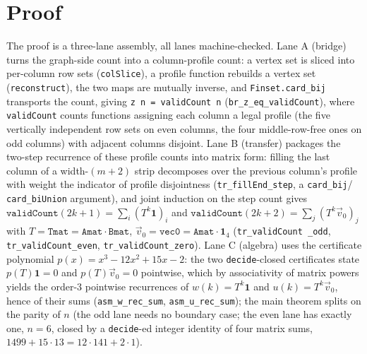 \documentclass[11pt]{article}
\begin{document}
\section{Proof}\label{sec:proof}

The proof is a three-lane assembly, all lanes machine-checked. Lane A
(bridge) turns the graph-side count into a column-profile count: a vertex
set is sliced into per-column row sets (\texttt{colSlice}), a profile
function rebuilds a vertex set (\texttt{reconstruct}), the two maps are
mutually inverse, and \texttt{Finset.card\_bij} transports the count, giving
\texttt{z n = validCount n} (\texttt{br\_z\_eq\_validCount}), where
\texttt{validCount} counts functions assigning each column a legal profile
(the five vertically independent row sets on even columns, the four
middle-row-free ones on odd columns) with adjacent columns disjoint. Lane B
(transfer) packages the two-step recurrence of these profile counts into
matrix form: filling the last column of a width-$(m{+}2)$ strip decomposes
over the previous column's profile with weight the indicator of profile
disjointness (\texttt{tr\_fillEnd\_step}, a \texttt{card\_bij}/%
\texttt{card\_biUnion} argument), and joint induction on the step count
gives $\texttt{validCount}(2k+1) = \sum_i (T^k \mathbf{1})_i$ and
$\texttt{validCount}(2k+2) = \sum_j (T^k \vec{v}_0)_j$ with
$T = \texttt{Tmat} = \texttt{Amat}\cdot\texttt{Bmat}$, $\vec{v}_0 =
\texttt{vec0} = \texttt{Amat}\cdot\mathbf{1}_4$ (\texttt{tr\_validCount%
\_odd}, \texttt{tr\_validCount\_even}, \texttt{tr\_validCount\_zero}). Lane
C (algebra) uses the certificate polynomial $p(x) = x^3 - 12x^2 + 15x - 2$:
the two \texttt{decide}-closed certificates state $p(T)\mathbf{1} = 0$ and
$p(T)\vec{v}_0 = 0$ pointwise, which by associativity of matrix powers
yields the order-3 pointwise recurrences of $w(k) = T^k\mathbf{1}$ and
$u(k) = T^k\vec{v}_0$, hence of their sums (\texttt{asm\_w\_rec\_sum},
\texttt{asm\_u\_rec\_sum}); the main theorem splits on the parity of $n$
(the odd lane needs no boundary case; the even lane has exactly one, $n=6$,
closed by a \texttt{decide}-ed integer identity of four matrix sums,
$1499 + 15 \cdot 13 = 12 \cdot 141 + 2 \cdot 1$).
\end{document}
